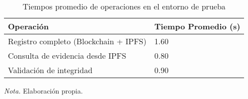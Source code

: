 \begin{table}[htbp]
    \centering
    \caption{Tiempos promedio de operaciones en el entorno de prueba}
    \begin{tabular}{|p{4cm}|p{3cm}|}
        \hline
        \textbf{Operación} & \textbf{Tiempo Promedio (s)} \\
        \hline
        Registro completo (Blockchain + IPFS) & 1.60 \\
        \hline
        Consulta de evidencia desde IPFS & 0.80 \\
        \hline
        Validación de integridad & 0.90 \\
        \hline
    \end{tabular}
    \vspace{1em}
    \begin{flushleft}
        \textit{Nota.} Elaboración propia.
    \end{flushleft}
\end{table}
